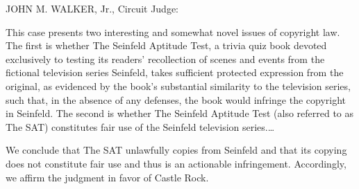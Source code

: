 
JOHN M. WALKER, Jr., Circuit Judge:

This case presents two interesting and somewhat novel issues of copyright law.
The first is whether The Seinfeld Aptitude Test, a trivia quiz book devoted
exclusively to testing its readers' recollection of scenes and events from the
fictional television series Seinfeld, takes sufficient protected expression
from the original, as evidenced by the book's substantial similarity to the
television series, such that, in the absence of any defenses, the book would
infringe the copyright in Seinfeld. The second is whether The Seinfeld Aptitude
Test (also referred to as The SAT) constitutes fair use of the Seinfeld
television series.\ldots

We conclude that The SAT unlawfully copies from Seinfeld and that its copying
does not constitute fair use and thus is an actionable infringement.
Accordingly, we affirm the judgment in favor of Castle Rock.


